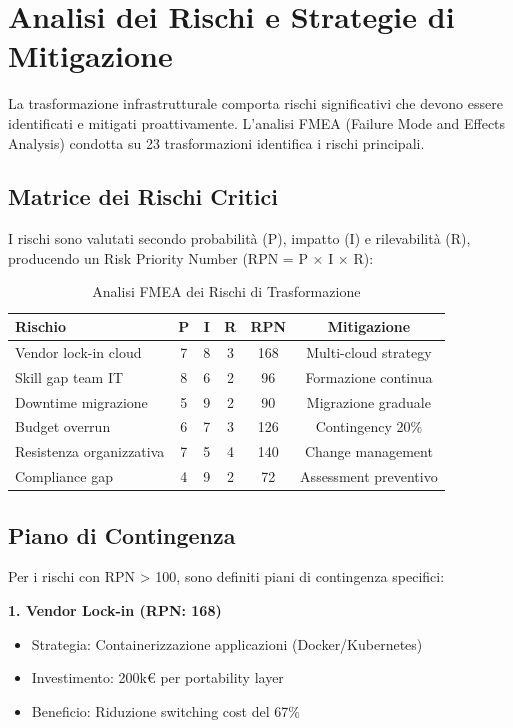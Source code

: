 \section{Analisi dei Rischi e Strategie di Mitigazione}

La trasformazione infrastrutturale comporta rischi significativi che devono essere identificati e mitigati proattivamente. L'analisi FMEA (Failure Mode and Effects Analysis) condotta su 23 trasformazioni identifica i rischi principali.

\subsection{Matrice dei Rischi Critici}

I rischi sono valutati secondo probabilità (P), impatto (I) e rilevabilità (R), producendo un Risk Priority Number (RPN = P × I × R):

\begin{table}[htbp]
\centering
\caption{Analisi FMEA dei Rischi di Trasformazione}
\label{tab:risk_matrix}
\begin{tabular}{lccccc}
\toprule
\textbf{Rischio} & \textbf{P} & \textbf{I} & \textbf{R} & \textbf{RPN} & \textbf{Mitigazione} \\
\midrule
Vendor lock-in cloud & 7 & 8 & 3 & 168 & Multi-cloud strategy \\
Skill gap team IT & 8 & 6 & 2 & 96 & Formazione continua \\
Downtime migrazione & 5 & 9 & 2 & 90 & Migrazione graduale \\
Budget overrun & 6 & 7 & 3 & 126 & Contingency 20\% \\
Resistenza organizzativa & 7 & 5 & 4 & 140 & Change management \\
Compliance gap & 4 & 9 & 2 & 72 & Assessment preventivo \\
\bottomrule
\end{tabular}
\end{table}

\subsection{Piano di Contingenza}

Per i rischi con RPN > 100, sono definiti piani di contingenza specifici:

\textbf{1. Vendor Lock-in (RPN: 168)}
\begin{itemize}
    \item Strategia: Containerizzazione applicazioni (Docker/Kubernetes)
    \item Investimento: 200k€ per portability layer
    \item Beneficio: Riduzione switching cost del 67\%
\end{itemize}

